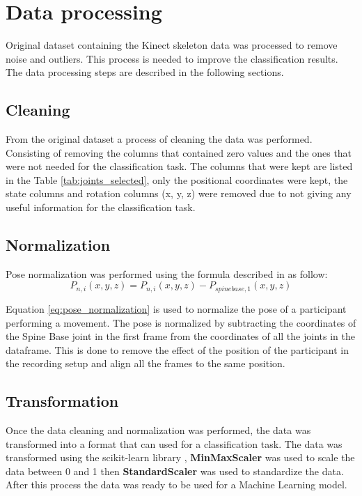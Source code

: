     \section{Data processing}

        Original dataset containing the Kinect skeleton data was processed to remove noise and outliers. This process is needed to improve the classification results. The data processing steps are described in the following sections.
        
        \subsection{Cleaning}
        
        From the original dataset a process of cleaning the data was performed. Consisting of removing the columns that contained zero values and the ones that were not needed for the classification task. The columns that were kept are listed in the Table \ref{tab:joints_selected}, only the positional coordinates were kept, the state columns and rotation columns (x, y, z) were removed due to not giving any useful information for the classification task.

        \subsection{Normalization}

        Pose normalization was performed using the formula described in \cite{maudsley-barton_comparative_2017} as follow:
        \begin{equation}
            P_{n,i}(x,y,z) = P_{n,i}(x,y,z)-P_{spinebase,1}(x,y,z)
            \label{eq:pose_normalization}
        \end{equation}

        Equation \ref{eq:pose_normalization} is used to normalize the pose of a participant performing a movement. The pose is normalized by subtracting the coordinates of the Spine Base joint in the first frame from the coordinates of all the joints in the dataframe. This is done to remove the effect of the position of the participant in the recording setup and align all the frames to the same position. 

        \subsection{Transformation}

        Once the data cleaning and normalization was performed, the data was transformed into a format that can used for a classification task. The data was transformed using the scikit-learn library \cite{sklearn_api}, \textbf{MinMaxScaler} was used to scale the data between 0 and 1 then \textbf{StandardScaler} was used to standardize the data. After this process the data was ready to be used for a Machine Learning model.

\cleardoublepage